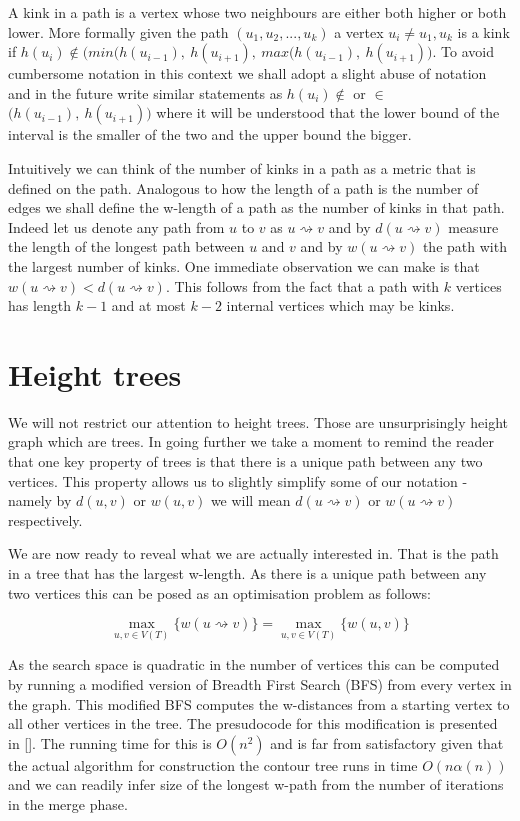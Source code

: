 A kink in a path is a vertex whose two neighbours are either both higher or both lower. More formally given the path $(u_1, u_2, ... , u_k)$ a vertex $u_i \ne u_1, u_k$ is a kink if $h(u_i) \notin \big( min(h(u_{i-1}),~h(u_{i+1}),~max(h(u_{i-1}),~h(u_{i+1}) \big)$. To avoid cumbersome notation in this context we shall adopt a slight abuse of notation and in the future write similar statements as $h(u_i) \notin $ or $ \in $ $\big(h(u_{i-1}),~h(u_{i+1}) \big)$ where it will be understood that the lower bound of the interval is the smaller of the two and the upper bound the bigger.

Intuitively we can think of the number of kinks in a path as a metric that is defined on the path. Analogous to how the length of a path is the number of edges we shall define the w-length of a path as the number of kinks in that path. Indeed let us denote any path from $u$ to $v$ as $u \rightsquigarrow v$ and by $d(u \rightsquigarrow v)$ measure the length of the longest path between $u$ and $v$ and by $w(u \rightsquigarrow v)$ the path with the largest number of kinks. One immediate observation we can make is that $w(u \rightsquigarrow v) < d(u \rightsquigarrow v)$. This follows from the fact that a path with $k$ vertices has length $k-1$ and at most $k-2$ internal vertices which may be kinks.

\section{Height trees}

We will not restrict our attention to height trees. Those are unsurprisingly height graph which are trees. In going further we take a moment to remind the reader that one key property of trees is that there is a unique path between any two vertices. This property allows us to slightly simplify some of our notation - namely by $d(u, v)$ or $w(u, v)$ we will mean $d(u \rightsquigarrow v)$ or $w(u \rightsquigarrow v)$ respectively.  

We are now ready to reveal what we are actually interested in. That is the path in a tree that has the largest w-length. As there is a unique path between any two vertices this can be posed as an optimisation problem as follows:

$$ \max_{u, v \in V(T)}\{ w(u \rightsquigarrow v) \} =  \max_{u, v \in V(T)}\{ w(u, v) \} $$

As the search space is quadratic in the number of vertices this can be computed by running a modified version of Breadth First Search (BFS) from every vertex in the graph. This modified BFS computes the w-distances from a starting vertex to all other vertices in the tree. The presudocode for this modification is presented in []. The running time for this is $O(n^2)$ and is far from satisfactory given that the actual algorithm for construction the contour tree runs in time $O(n\alpha(n))$ and we can readily infer size of the longest w-path from the number of iterations in the merge phase.

